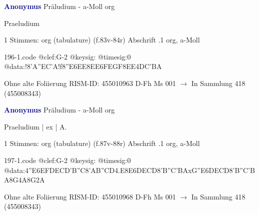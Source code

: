 \documentclass[twocolumn]{book}
\begin{document}
\newline \par \vspace{7pt} \textcolor{darkblue}{\textbf{Anonymus  }}
\newline Präludium - a-Moll
\newline org
\newline \begin{itshape}[f.83v, at left:] Praeludium\end{itshape} 
\newline \textcolor{darkblue}{}  1 Stimmen: org (tabulature)  (f.83v-84r)
\newline Abschrift
.1  org, a-Moll  
\begin{filecontents*}{196-1.code}
@clef:G-2
@keysig:
@timesig:0
@data:!{8'A''EC'A}!f{8''E6EE}{8EE}{6FEGF}{8EE}4DC'BA
\end{filecontents*}
\newline
%
\newline Ohne alte Foliierung
\newline RISM-ID: 455010963
\newline D-Fh  Ms 001
\newline $\rightarrow$ In Sammlung 418 (455008343)
      
\newline \par \vspace{7pt} \textcolor{darkblue}{\textbf{Anonymus  }}
\newline Präludium - a-Moll
\newline org
\newline \begin{itshape}[f.87v, at left:] Praeludium | ex | A.\end{itshape} 
\newline \textcolor{darkblue}{}  1 Stimmen: org (tabulature)  (f.87v-88r)
\newline Abschrift
.1  org, a-Moll  
\begin{filecontents*}{197-1.code}
@clef:G-2
@keysig:
@timesig:0
@data:4''E{6EFDE}{CD'B''C}{8'AB}{''CD}4.E8E{6DECD}{8'B''C'BA}{xG''E}{6DECD}{8'B''C'BA}8G4A8G2A
\end{filecontents*}
\newline
%
\newline Ohne alte Foliierung
\newline RISM-ID: 455010968
\newline D-Fh  Ms 001
\newline $\rightarrow$ In Sammlung 418 (455008343)
      
\end{document}
